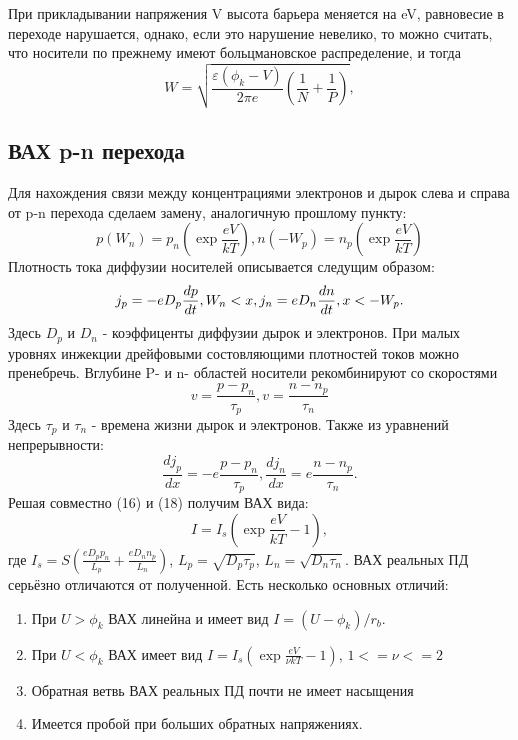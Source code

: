 \documentclass[a4paper]{article}
\begin{document}
    При прикладывании напряжения V высота барьера меняется на eV, равновесие в переходе нарушается, однако, если это нарушение невелико, то можно считать, что носители по прежнему имеют больцмановское распределение, и тогда 
    \begin{equation}
    W = \sqrt{\frac{\varepsilon (\phi_k - V)}{2\pi e}(\frac{1}{N}+\frac{1}{P})},
    \end{equation}
    \subsection{ВАХ p-n перехода}
    Для нахождения связи между концентрациями электронов и дырок слева и справа от p-n перехода сделаем замену, аналогичную прошлому пункту:
    \begin{equation}
        p(W_n) = p_n(\exp{\frac{eV}{kT}}), n(-W_p) = n_p(\exp{\frac{eV}{kT}})
    \end{equation}
    Плотность тока диффузии носителей описывается следущим образом:
    \begin{equation}
        j_p = -e D_p \frac{dp}{dt}, W_n < x, \\
        j_n = e D_n \frac{dn}{dt}, x < -W_p.
    \end{equation}
    Здесь $D_p$ и $D_n$ - коэффиценты диффузии дырок и электронов. При малых уровнях инжекции дрейфовыми состовляющими плотностей токов можно пренебречь. Вглубине P- и n- областей носители рекомбинируют со скоростями
    \begin{equation}
        v=\frac{p-p_n}{\tau_p}, v=\frac{n-n_p}{\tau_n}
    \end{equation}
    Здесь $\tau_p$ и $\tau_n$ - времена жизни дырок и электронов. Также из уравнений непрерывности:
    \begin{equation}
        \frac{dj_p}{dx} = -e\frac{p-p_n}{\tau_p},
        \frac{dj_n}{dx} = e \frac{n-n_p}{\tau_n}.
    \end{equation}
    Решая совместно (16) и (18) получим ВАХ вида:
    \begin{equation}
        I=I_s(\exp{\frac{eV}{kT}}-1),
    \end{equation}
    где $I_s = S(\frac{eD_pp_n}{L_p}+\frac{eD_nn_p}{L_n})$, $L_p = \sqrt{D_p\tau_p}$, $L_n = \sqrt{D_n\tau_n}$.
    ВАХ реальных ПД серьёзно отличаются от полученной. Есть несколько основных отличий:
    \begin{enumerate}
        \item При $U>\phi_k$ ВАХ линейна и имеет вид $I=(U-\phi_k)/r_b$.
        \item При $U<\phi_k$ ВАХ имеет вид
        $I=I_s(\exp{\frac{eV}{\nu kT}}-1)$, $1<=\nu<=2$
        \item Обратная ветвь ВАХ реальных ПД почти не имеет насыщения
        \item Имеется пробой при больших обратных напряжениях.
    \end{enumerate}
\end{document}
